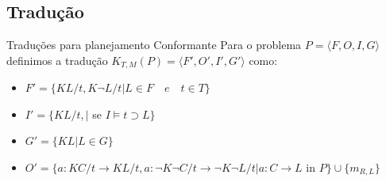 \subsection{Tradução}
\begin{frame}{Traduções para planejamento Conformante}
Para o problema $P=\langle F, O, I, G\rangle$ definimos a tradução $K_{T,M}(P) = 
\langle F', O', I', G'\rangle$ como:
\begin{itemize}
\item $F' = \lbrace KL/t, K\lnot L/t \vert L \in F \quad e \quad t \in T 
\rbrace$
\item $I' = \lbrace KL/t, \vert$ se $I \models t \supset L  \rbrace$ 
\item $G' = \lbrace KL \vert L \in G \rbrace$
\item $O' = \lbrace a: KC/t \rightarrow KL/t, a: \lnot K \lnot C / t \rightarrow 
\lnot K \lnot L/t \vert a: C \rightarrow L$ in $P \rbrace \cup \lbrace m_{R,L} 
\rbrace$ 
\end{itemize}
\end{frame}
% 
%         
% 


